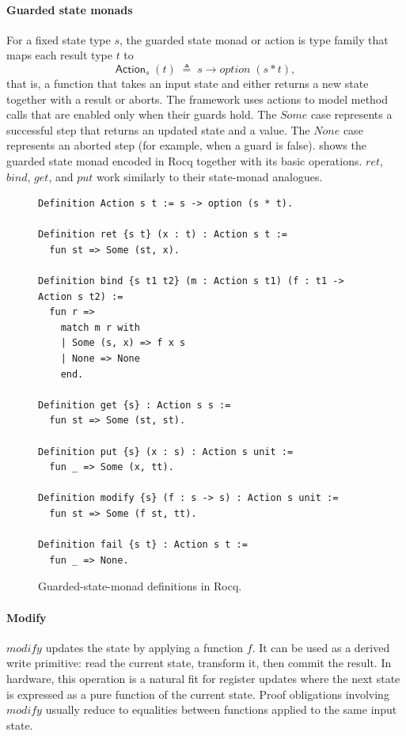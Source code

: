 \documentclass[fontset=fira-newtxsf]{mitthesis}
\theoremstyle{definition}
\theoremstyle{plain}
\begin{document}
\paragraph{Guarded state monads}
For a fixed state type $s$, the guarded state monad or action is type family that maps each result type $t$ to
\[
  \mathsf{Action}_s\;(t) \;\triangleq\; s \to \mathit{option}\;(s * t)
,\]
that is, a function that takes an input state and either returns a new state together with a result or aborts.
The framework uses actions to model method calls that are enabled only when their guards hold.
The $\mathit{Some}$ case represents a successful step that returns an updated state and a value.
The $\mathit{None}$ case represents an aborted step (for example, when a guard is false).
 shows the guarded state monad encoded in Rocq together with its basic operations.
$\mathit{ret}$, $\mathit{bind}$, $\mathit{get}$, and $\mathit{put}$ work similarly to their state-monad analogues.

\begin{figure}[H]
\begin{verbatim}
Definition Action s t := s -> option (s * t).

Definition ret {s t} (x : t) : Action s t :=
  fun st => Some (st, x).

Definition bind {s t1 t2} (m : Action s t1) (f : t1 -> Action s t2) :=
  fun r =>
    match m r with
    | Some (s, x) => f x s
    | None => None
    end.

Definition get {s} : Action s s :=
  fun st => Some (st, st).

Definition put {s} (x : s) : Action s unit :=
  fun _ => Some (x, tt).

Definition modify {s} (f : s -> s) : Action s unit :=
  fun st => Some (f st, tt).

Definition fail {s t} : Action s t :=
  fun _ => None.
\end{verbatim}
\caption[Guarded-state-monad definitions]{Guarded-state-monad definitions in Rocq.}
\label{fig:guarded-state-monad-core}
\end{figure}

\paragraph{Modify}
$\mathit{modify}$ updates the state by applying a function $\mathit{f}$.
It can be used as a derived write primitive: read the current state, transform it, then commit the result.
In hardware, this operation is a natural fit for register updates where the next state is expressed as a pure function of the current state.
Proof obligations involving $\mathit{modify}$ usually reduce to equalities between functions applied to the same input state.
\end{document}

